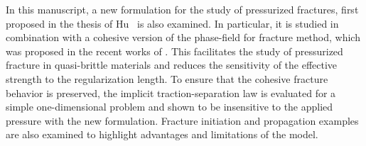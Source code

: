 In this manuscript, a new formulation for the study of pressurized fractures, first proposed in the thesis of Hu~\cite{hu2021variationalthesis} is also examined. In particular, it is studied in combination with a cohesive version of the phase-field for fracture method, which was proposed in the recent works of \cite{lorentz2011convergence, geelen2019phase, wu2017unified}.  This facilitates the study of pressurized fracture in quasi-brittle materials and reduces the sensitivity of the effective strength to the regularization length. To ensure that the cohesive fracture behavior is preserved, the implicit traction-separation law is evaluated for a simple one-dimensional problem and shown to be insensitive to the applied pressure with the new formulation. 
Fracture initiation and propagation examples are also examined to highlight advantages and limitations of the model. 

